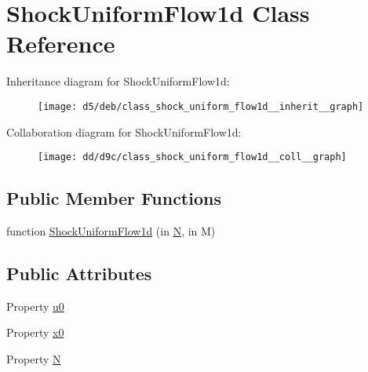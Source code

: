 \hypertarget{class_shock_uniform_flow1d}{}\section{Shock\+Uniform\+Flow1d Class Reference}
\label{class_shock_uniform_flow1d}


Inheritance diagram for Shock\+Uniform\+Flow1d\+:
\nopagebreak
\begin{figure}[H]
\begin{center}
\leavevmode
\texttt{[image: d5/deb/class\_shock\_uniform\_flow1d\_\_inherit\_\_graph]}
\end{center}
\end{figure}


Collaboration diagram for Shock\+Uniform\+Flow1d\+:
\nopagebreak
\begin{figure}[H]
\begin{center}
\leavevmode
\texttt{[image: dd/d9c/class\_shock\_uniform\_flow1d\_\_coll\_\_graph]}
\end{center}
\end{figure}
\subsection*{Public Member Functions}
\begin{DoxyCompactItemize}
\item 
function \hyperlink{class_shock_uniform_flow1d_a4b91c30d5ae9b02e23b47854da95d041}{Shock\+Uniform\+Flow1d} (in \hyperlink{class_shock_uniform_flow1d_a36c2207dd55ffea8931b95ef116ff087}{N}, in M)
\end{DoxyCompactItemize}
\subsection*{Public Attributes}
\begin{DoxyCompactItemize}
\item 
Property \hyperlink{class_shock_uniform_flow1d_afb08b622dcfaf26289ce0b5d060d6705}{u0}
\item 
Property \hyperlink{class_shock_uniform_flow1d_a1b292124796a4446d48a08f2562cf657}{x0}
\item 
Property \hyperlink{class_shock_uniform_flow1d_a36c2207dd55ffea8931b95ef116ff087}{N}
\end{DoxyCompactItemize}
